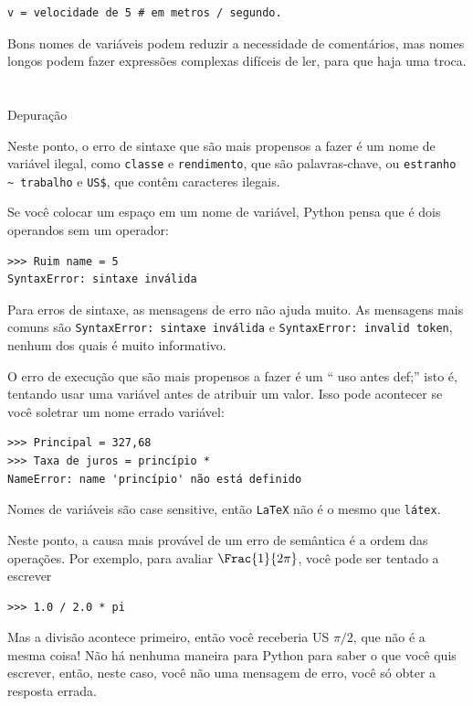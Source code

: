 \documentclass[10pt]{book}
\begin{document}
\begin{verbatim}
v = velocidade de 5 # em metros / segundo. 
\end{verbatim}
%
Bons nomes de variáveis ​​podem reduzir a necessidade de comentários, mas
nomes longos podem fazer expressões complexas difíceis de ler, para que haja
uma troca.


\section{} Depuração

Neste ponto, o erro de sintaxe que são mais propensos a fazer é
um nome de variável ilegal, como {\tt classe} e {\tt rendimento}, que
são palavras-chave, ou \verb "estranho ~ trabalho" e \verb"US$", que contêm
caracteres ilegais.

Se você colocar um espaço em um nome de variável, Python pensa que é dois
operandos sem um operador:

\begin{verbatim}
>>> Ruim name = 5
SyntaxError: sintaxe inválida
\end{verbatim}
%
Para erros de sintaxe, as mensagens de erro não ajuda muito.
As mensagens mais comuns são {\tt SyntaxError: sintaxe inválida} e
{\tt SyntaxError: invalid token}, nenhum dos quais é muito informativo.

O erro de execução que são mais propensos a fazer é um `` uso antes
def;'' isto é, tentando usar uma variável antes de atribuir
um valor. Isso pode acontecer se você soletrar um nome errado variável:

\begin{verbatim}
>>> Principal = 327,68
>>> Taxa de juros = princípio *
NameError: name 'princípio' não está definido
\end{verbatim}
%
Nomes de variáveis ​​são case sensitive, então {\tt LaTeX} não é o
mesmo que {\tt látex}.

Neste ponto, a causa mais provável de um erro de semântica é
a ordem das operações. Por exemplo, para avaliar
 $ \Frac {1} {2 \pi} $,
você pode ser tentado a escrever

\begin{verbatim}
>>> 1.0 / 2.0 * pi
\end{verbatim}
%
Mas a divisão acontece primeiro, então você receberia US $ \pi / 2 $, que
não é a mesma coisa! Não há nenhuma maneira para Python
para saber o que você quis escrever, então, neste caso, você não
uma mensagem de erro, você só obter a resposta errada.
\end{document}
